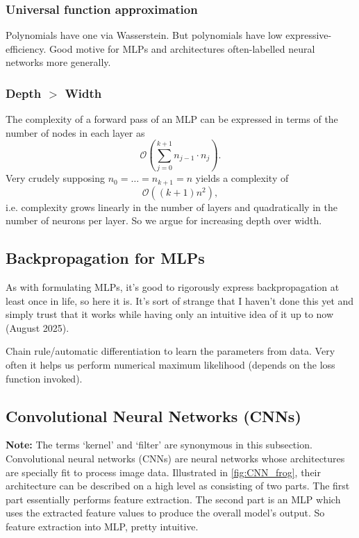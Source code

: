 \documentclass[11pt]{article}
\begin{document}
\subsubsection{Universal function approximation}
\label{subsubsec:universal_function_approximation_theorem}
Polynomials have one via Wasserstein. But polynomials have low expressive-efficiency. Good motive for MLPs and architectures often-labelled neural networks more generally.

\subsubsection{Depth $>$ Width}
\label{subsubsec:deep_MLPs}
The complexity of a forward pass of an MLP can be expressed in terms of the number of nodes in each layer as
$$
\mathcal{O}
\left(
\sum_{j=0}^{k+1}n_{j-1}\cdot n_j
\right).
$$
Very crudely supposing $n_0=\dots=n_{k+1}=n$ yields a complexity of
$$
\mathcal{O}((k+1)n^2),
$$
i.e. complexity grows linearly in the number of layers and quadratically in the number of neurons per layer. So we argue for increasing depth over width.

\subsection{Backpropagation for MLPs}
\label{subsec:backprop}
As with formulating MLPs, it's good to rigorously express backpropagation at least once in life, so here it is. It's sort of strange that I haven't done this yet and simply trust that it works while having only an intuitive idea of it up to now (August 2025).

Chain rule/automatic differentiation to learn the parameters from data. Very often it helps us perform numerical maximum likelihood (depends on the loss function invoked).

\subsection{Convolutional Neural Networks (CNNs)}
\label{subsec:conv_neural_networks}

\textbf{Note:} The terms `kernel' and `filter' are synonymous in this subsection.\\

\noindent Convolutional neural networks (CNNs) are neural networks whose architectures are specially fit to process image data. Illustrated in \autoref{fig:CNN_frog}, their architecture can be described on a high level as consisting of two parts. The first part essentially performs feature extraction. The second part is an MLP which uses the extracted feature values to produce the overall model's output. So feature extraction into MLP, pretty intuitive.
\end{document}
